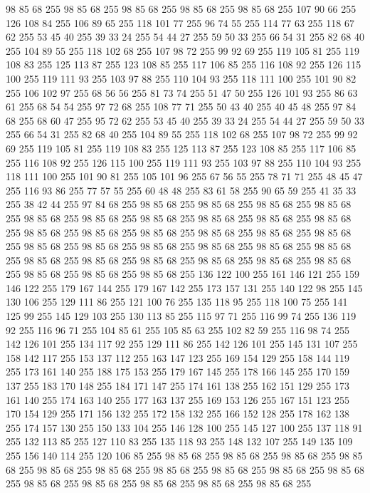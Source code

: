 98 85 68 255 98 85 68 255 98 85 68 255 98 85 68 255 98 85 68 255 107 90 66 255 126 108 84 255 106 89 65 255 118 101 77 255 96 74 55 255 114 77 63 255 118 67 62 255 53 45 40 255 39 33 24 255 54 44 27 255 59 50 33 255 66 54 31 255 82 68 40 255 104 89 55 255 118 102 68 255 107 98 72 255 99 92 69 255 119 105 81 255 119 108 83 255 125 113 87 255 123 108 85 255 117 106 85 255 116 108 92 255 126 115 100 255 119 111 93 255 103 97 88 255 110 104 93 255 118 111 100 255 101 90 82 255 106 102 97 255 68 56 56 255 81 73 74 255 51 47 50 255 126 101 93 255 86 63 61 255 68 54 54 255 97 72 68 255 108 77 71 255 50 43 40 255 40 45 48 255 97 84 68 255 68 60 47 255 95 72 62 255 53 45 40 255 39 33 24 255 54 44 27 255 59 50 33 255 66 54 31 255 82 68 40 255 104 89 55 255 118 102 68 255 107 98 72 255 99 92 69 255 119 105 81 255 119 108 83 255 125 113 87 255 123 108 85 255 117 106 85 255 116 108 92 255
126 115 100 255 119 111 93 255 103 97 88 255 110 104 93 255 118 111 100 255 101 90 81 255 105 101 96 255 67 56 55 255 78 71 71 255 48 45 47 255 116 93 86 255 77 57 55 255 60 48 48 255 83 61 58 255 90 65 59 255 41 35 33 255 38 42 44 255 97 84 68 255 98 85 68 255 98 85 68 255 98 85 68 255 98 85 68 255 98 85 68 255 98 85 68 255 98 85 68 255 98 85 68 255 98 85 68 255 98 85 68 255 98 85 68 255 98 85 68 255 98 85 68 255 98 85 68 255 98 85 68 255 98 85 68 255 98 85 68 255 98 85 68 255 98 85 68 255 98 85 68 255 98 85 68 255 98 85 68 255 98 85 68 255 98 85 68 255 98 85 68 255 98 85 68 255 98 85 68 255 98 85 68 255 98 85 68 255 98 85 68 255 98 85 68 255 136 122 100 255 161 146 121 255 159 146 122 255 179 167 144 255 179 167 142 255 173 157 131 255 140 122 98 255 145 130 106 255 129 111 86 255 121 100 76 255 135 118 95 255 118 100 75 255 141 125 99 255 145 129 103 255 130 113 85 255
115 97 71 255 116 99 74 255 136 119 92 255 116 96 71 255 104 85 61 255 105 85 63 255 102 82 59 255 116 98 74 255 142 126 101 255 134 117 92 255 129 111 86 255 142 126 101 255 145 131 107 255 158 142 117 255 153 137 112 255 163 147 123 255 169 154 129 255 158 144 119 255 173 161 140 255 188 175 153 255 179 167 145 255 178 166 145 255 170 159 137 255 183 170 148 255 184 171 147 255 174 161 138 255 162 151 129 255 173 161 140 255 174 163 140 255 177 163 137 255 169 153 126 255 167 151 123 255 170 154 129 255 171 156 132 255 172 158 132 255 166 152 128 255 178 162 138 255 174 157 130 255 150 133 104 255 146 128 100 255 145 127 100 255 137 118 91 255 132 113 85 255 127 110 83 255 135 118 93 255 148 132 107 255 149 135 109 255 156 140 114 255 120 106 85 255 98 85 68 255 98 85 68 255 98 85 68 255 98 85 68 255 98 85 68 255 98 85 68 255 98 85 68 255 98 85 68 255 98 85 68 255 98 85 68 255 98 85 68 255 98 85 68 255 98 85 68 255 98 85 68 255 98 85 68 255
